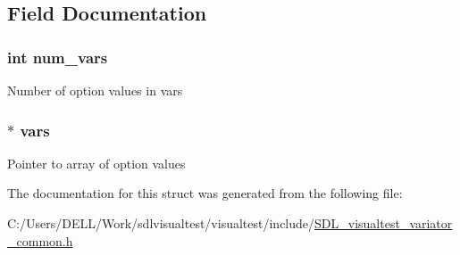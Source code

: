 \subsection{Field Documentation}
\hypertarget{struct_s_d_l_visual_test___variation_a2daded0b80f9ab7ed3703cc2686e5a92}{
\subsubsection[{num\-\_\-vars}]{\setlength{\rightskip}{0pt plus 5cm}int num\-\_\-vars}}\label{struct_s_d_l_visual_test___variation_a2daded0b80f9ab7ed3703cc2686e5a92}
Number of option values in {\ttfamily vars} \hypertarget{struct_s_d_l_visual_test___variation_a1eab2e90f0195b4f4632eb19523aeadf}{
\subsubsection[{vars}]{$\ast$ vars}}\label{struct_s_d_l_visual_test___variation_a1eab2e90f0195b4f4632eb19523aeadf}
Pointer to array of option values 

The documentation for this struct was generated from the following file\-:\begin{DoxyCompactItemize}
\item 
C\-:/\-Users/\-D\-E\-L\-L/\-Work/sdlvisualtest/visualtest/include/\hyperlink{_s_d_l__visualtest__variator__common_8h}{S\-D\-L\-\_\-visualtest\-\_\-variator\-\_\-common.\-h}\end{DoxyCompactItemize}
